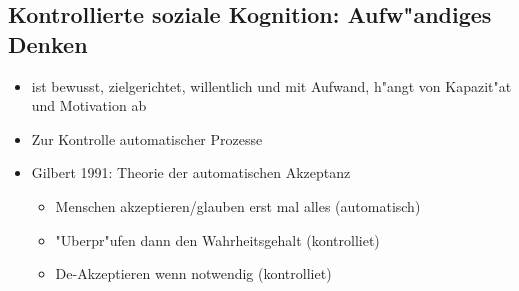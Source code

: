 \subsection{Kontrollierte soziale Kognition: Aufw"andiges Denken}
\begin{itemize}
	\item
		ist bewusst, zielgerichtet, willentlich und mit Aufwand, h"angt von Kapazit"at und Motivation ab
	\item
		Zur Kontrolle automatischer Prozesse
	\item
		Gilbert 1991: Theorie der automatischen Akzeptanz
		\begin{itemize}
			\item
				Menschen akzeptieren/glauben erst mal alles (automatisch)
			\item
				"Uberpr"ufen dann den Wahrheitsgehalt (kontrolliet)
			\item
				De-Akzeptieren wenn notwendig (kontrolliet)
		\end{itemize}
\end{itemize}


